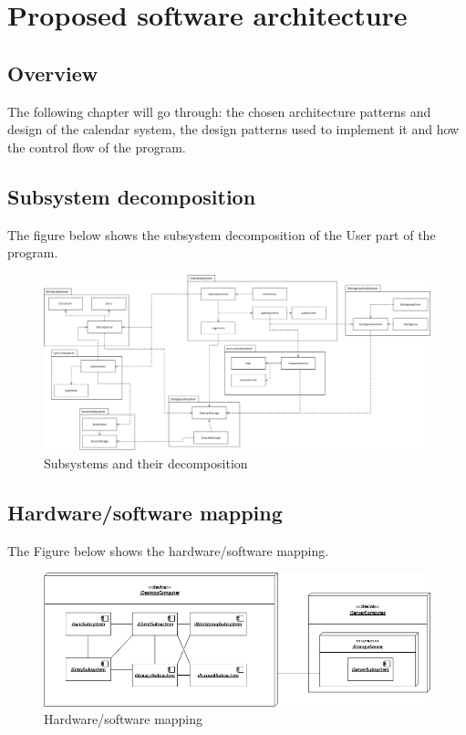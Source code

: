 \section{Proposed software architecture}

\subsection{Overview}
The following chapter will go through: the chosen architecture patterns and design of the calendar system, the design patterns used to implement it and how the control flow of the program.
\subsection{Subsystem decomposition}
The figure below shows the subsystem decomposition of the User part of the program.

\begin{figure}[h]
\centering
\includegraphics[scale = 0.35]{Subsystem}
\caption{Subsystems and their decomposition}
\end{figure}

\pagebreak

\subsection{Hardware/software mapping}
The Figure below shows the hardware/software mapping.

\begin{figure}[h]
\centering
\includegraphics[scale = 0.7]{deployment}
\caption{Hardware/software mapping}
\end{figure}

